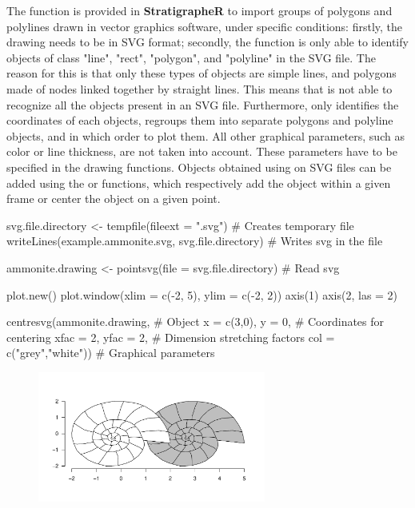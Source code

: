 The  function is provided in \textbf{StratigrapheR} to import groups of polygons and polylines drawn in vector graphics software, under specific conditions: firstly, the drawing needs to be in SVG format; secondly, the  function is only able to identify objects of class "line", "rect", "polygon", and "polyline" in the SVG file. The reason for this is that only these types of objects are simple lines, and polygons made of nodes linked together by straight lines. This means that  is not able to recognize all the objects present in an SVG file. Furthermore,  only identifies the coordinates of each objects, regroups them into separate polygons and polyline objects, and in which order to plot them. All other graphical parameters, such as color or line thickness, are not taken into account. These parameters have to be specified in the drawing functions. Objects obtained using  on SVG files can be added using the  or  functions, which respectively add the object within a given frame or center the object on a given point.

\begin{example}
svg.file.directory <- tempfile(fileext = ".svg")     # Creates temporary file
writeLines(example.ammonite.svg, svg.file.directory) # Writes svg in the file

ammonite.drawing <- pointsvg(file = svg.file.directory) # Read svg

plot.new()
plot.window(xlim = c(-2, 5), ylim = c(-2, 2))
axis(1)
axis(2, las = 2)

centresvg(ammonite.drawing,  # Object
          x = c(3,0), y = 0,  # Coordinates for centering
          xfac = 2, yfac = 2,  # Dimension stretching factors
          col = c("grey","white"))  # Graphical parameters
\end{example}

\begin{figure}[H]
	\centering
	\includegraphics[width=75mm]{ammonite}
\end{figure}

